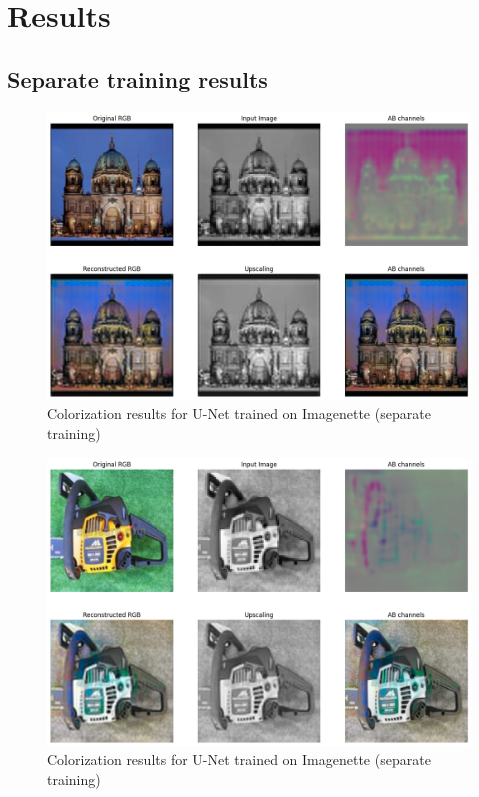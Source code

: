\documentclass[aspectratio=169]{beamer}
\theoremstyle{definition}
\begin{document}
\section{Results}
\subsection{Separate training results}
\begin{frame}
    \tableofcontents[currentsubsection]
\end{frame}

\begin{frame}
    \begin{figure}
        \centering
        \includegraphics[width=.75\textwidth]{demo-pipeline/building.png}
        \caption{Colorization results for U-Net trained on Imagenette (separate training)}
    \end{figure}
\end{frame}

\begin{frame}
    \begin{figure}
        \centering
        \includegraphics[width=.75\textwidth]{demo-pipeline/chainsaw.png}
        \caption{Colorization results for U-Net trained on Imagenette (separate training)}
    \end{figure}
\end{frame}
\end{document}
